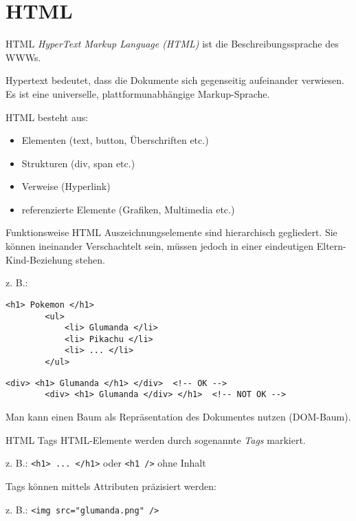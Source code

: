 \section{HTML}

\begin{defi}{HTML}
    \emph{HyperText Markup Language (HTML)} ist die Beschreibungssprache des WWWs.

    Hypertext bedeutet, dass die Dokumente sich gegenseitig aufeinander verwiesen.
    Es ist eine universelle, plattformunabhängige Markup-Sprache.

    HTML besteht aus:
    \begin{itemize}
        \item Elementen (text, button, Überschriften etc.)
        \item Strukturen (div, span etc.)
        \item Verweise (Hyperlink)
        \item referenzierte Elemente (Grafiken, Multimedia etc.)
    \end{itemize}
\end{defi}

\begin{defi}{Funktionsweise HTML}
    Auszeichnungselemente sind hierarchisch gegliedert.
    Sie können ineinander Verschachtelt sein, müssen jedoch in einer eindeutigen Eltern-Kind-Beziehung stehen.

    z. B.:

    \begin{lstlisting}[language=HTML5]
        <h1> Pokemon </h1>
        <ul>
            <li> Glumanda </li>
            <li> Pikachu </li>
            <li> ... </li>
        </ul>
    \end{lstlisting}

    \begin{lstlisting}[language=HTML5]
        <div> <h1> Glumanda </h1> </div>  <!-- OK -->
        <div> <h1> Glumanda </div> </h1>  <!-- NOT OK -->
    \end{lstlisting}

    Man kann einen Baum als Repräsentation des Dokumentes nutzen (DOM-Baum).
\end{defi}

\begin{defi}{HTML Tags}
    HTML-Elemente werden durch sogenannte \emph{Tags} markiert.

    z. B.: \texttt{<h1> ... </h1>} oder \texttt{<h1 />} ohne Inhalt

    Tags können mittels Attributen präzisiert werden:

    z. B.: \texttt{<img src="glumanda.png" />}
\end{defi}

